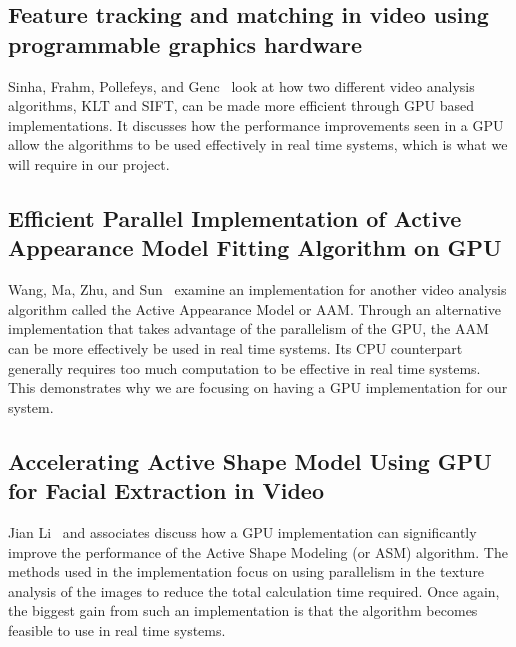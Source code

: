 	\subsection{Feature tracking and matching in video using programmable graphics hardware}
	
	Sinha, Frahm, Pollefeys, and Genc~ look at how two different video analysis algorithms, KLT and SIFT, can be made more efficient through GPU based implementations. It discusses how the performance improvements seen in a GPU allow the algorithms to be used effectively in real time systems, which is what we will require in our project.
	
	\subsection{Efficient Parallel Implementation of Active Appearance Model Fitting Algorithm on GPU}
	
	Wang, Ma, Zhu, and Sun~ examine an implementation for another video analysis algorithm called the Active Appearance Model or AAM. Through an alternative implementation that takes advantage of the parallelism of the GPU, the AAM can be more effectively be used in real time systems. Its CPU counterpart generally requires too much computation to be effective in real time systems. This demonstrates why we are focusing on having a GPU implementation for our system.
	
	\subsection{Accelerating Active Shape Model Using GPU for Facial Extraction in Video}
	
	Jian Li~ and associates discuss how a GPU implementation can significantly improve the performance of the Active Shape Modeling (or ASM) algorithm. The methods used in the implementation focus on using parallelism in the texture analysis of the images to reduce the total calculation time required. Once again, the biggest gain from such an implementation is that the algorithm becomes feasible to use in real time systems.